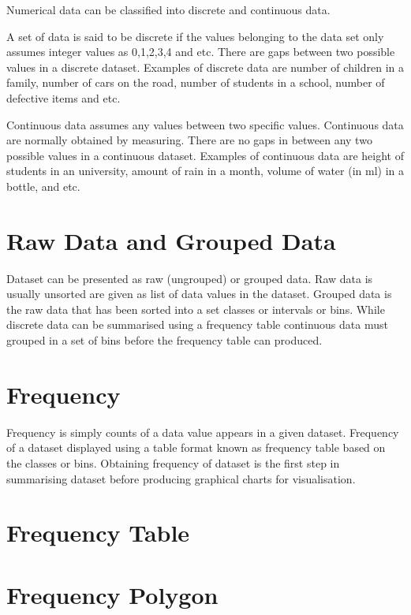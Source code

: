 Numerical data can be classified into discrete and continuous data. 

A set of data is said to be discrete if the values belonging to the data set only assumes integer values as 0,1,2,3,4 and etc. There are gaps between two possible values in a discrete dataset. Examples of discrete data are number of children in a family, number of cars on the road, number of students in a school, number of defective items and etc.

Continuous data assumes any values between two specific values. Continuous data are normally obtained by measuring. There are no gaps in between any two possible values in a continuous dataset. Examples of continuous data are height of students in an university, amount of rain in a month, volume of water (in ml) in a bottle, and etc. 

\section{Raw Data and Grouped Data}
 
Dataset can be presented as raw (ungrouped) or grouped data. Raw data is usually unsorted are given as list of data values in the dataset. Grouped data is the raw data that has been sorted into a set classes or intervals or bins. While discrete data can be summarised using a frequency table continuous data must grouped in a set of bins before the frequency table can produced.


\section{Frequency}

Frequency is simply counts of a data value appears in a given dataset.  Frequency of a dataset displayed using a table format known as frequency table based on the classes or bins. Obtaining  frequency of dataset is the first step in summarising dataset before producing graphical charts for visualisation.




\section{Frequency Table}




\section{Frequency Polygon}


